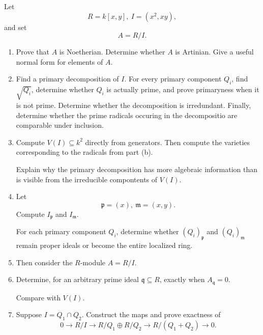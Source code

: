 \documentclass[11pt]{article}
\begin{document}
\newpage
\begin{prob}
    Let 
    \[
        R = k[x,y], \ I = (x^2,xy), 
    \]
    and set 
    \[
        A = R/I. 
    \]

    \begin{enumerate}[label=(\alph*)]
        \item Prove that $A$ is Noetherian. 
            Determine whether $A$ is Artinian. 
            Give a useful normal form for elements 
            of $A$. 
        \item Find a primary decomposition of $I$. 
            For every primary component $Q_i$, 
            find $\sqrt{Q_i}$, determine 
            whether $Q_i$ is actually prime, 
            and prove primaryness when it is not 
            prime. 
            Determine whether the decomposition 
            is irredundant. 
            Finally, determine whether the 
            prime radicals occuring in the decompositio 
            are comparable under inclusion. 
        \item Compute $V(I) \subseteq k^2$ 
            directly from generators. 
            Then compute the varieties corresponding 
            to the radicals from part (b).

            Explain why the primary decomposition 
            has more algebraic information than 
            is visible from the irreducible compontents 
            of $V(I)$. 

        \item Let 
            \[
                \mathfrak p = (x), \ \mathfrak m = (x,y). 
            \]
            Compute $I_{\mathfrak p}$ and 
            $I_{\mathfrak m}$. 

            For each primary component $Q_i$, determine 
            whether $(Q_i)_{\mathfrak p}$ and 
            $(Q_i)_{\mathfrak m}$ remain 
            proper ideals or become the entire 
            localized ring. 
        \item Then consider the $R$-module $A = R/I$. 
        \item Determine, for an arbitrary prime ideal 
            $\mathfrak q\subseteq R$, exactly when 
            $A_{\mathfrak q} = 0$. 

            Compare with $V(I)$. 
        \item Suppose $I = Q_1 \cap Q_2$. 
            Construct the maps and prove exactness of 
            \[
                0 \to R/I \to R/Q_1 \oplus 
                R/Q_2 \to R/(Q_1 + Q_2) \to 0. 
            \]


\end{enumerate}
\end{prob}
\end{document}
